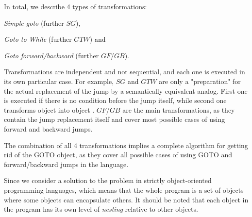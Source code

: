 \documentclass[sigplan,review,11pt,nonacm,natbib=false]{acmart}
\theoremstyle{theorems}
\begin{document}
In total, we describe 4 types of transformations:
\begin{inparaenum}[1)]
\item \emph{Simple goto} (further $SG$),
\item \emph{Goto to While} (further $GTW$) and
\item \emph{Goto forward/backward} (further $GF$/$GB$).
\end{inparaenum}
Transformations are independent and not sequential, and each one is executed in its own particular case.
For example, $SG$ and $GTW$ are only a "preparation" for the actual replacement of the jump by a semantically equivalent analog.
First one is executed if there is no condition before the jump itself, while second one transforms object  into object .
$GF$/$GB$ are the main transformations, as they contain the jump replacement itself and cover most possible cases of using forward and backward jumps.



The combination of all 4 transformations implies a complete algorithm for getting rid of the GOTO object, as they cover all possible cases of using GOTO and forward/backward jumps in the language.

Since we consider a solution to the problem in strictly object-oriented programming languages, which means that the whole program is a set of objects where some objects can encapsulate others.
It should be noted that each object in the program has its own level of \emph{nesting} relative to other objects.
\end{document}

